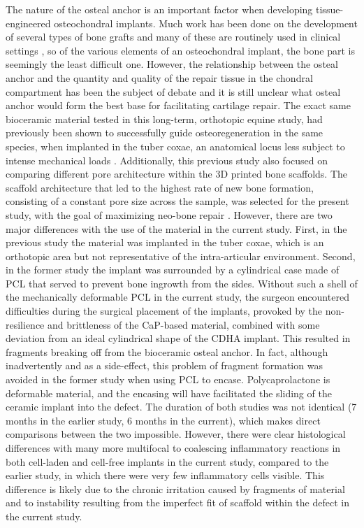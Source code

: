 \documentclass[twocolumn, empirical, authordate, issue]{jote-new-article}
\begin{document}
The nature of the osteal anchor is an important factor when developing tissue-engineered osteochondral implants. Much work has been done on the development of several types of bone grafts and many of these are routinely used in clinical settings \parencite{Oryan2014}, so of the various elements of an osteochondral implant, the bone part is seemingly the least difficult one. However, the relationship between the osteal anchor and the quantity and quality of the repair tissue in the chondral compartment has been the subject of debate \parencite{Bal2010} and it is still unclear what osteal anchor would form the best base for facilitating cartilage repair. The exact same bioceramic material tested in this long-term, orthotopic equine study, had previously been shown to successfully guide osteoregeneration in the same species, when implanted in the tuber coxae, an anatomical locus less subject to intense mechanical loads \parencite{Diloksumpan2020}. Additionally, this previous study also focused on comparing different pore architecture within the 3D printed bone scaffolds. The scaffold architecture that led to the highest rate of new bone formation, consisting of a constant pore size across the sample, was selected for the present study, with the goal of maximizing neo-bone repair \parencite{Diloksumpan2020}. However, there are two major differences with the use of the material in the current study. First, in the previous study the material was implanted in the tuber coxae, which is an orthotopic area but not representative of the intra-articular environment. Second, in the former study the implant was surrounded by a cylindrical case made of PCL that served to prevent bone ingrowth from the sides. Without such a shell of the mechanically deformable PCL in the current study, the surgeon encountered difficulties during the surgical placement of the implants, provoked by the non-resilience and brittleness of the CaP-based material, combined with some deviation from an ideal cylindrical shape of the CDHA implant. This resulted in fragments breaking off from the bioceramic osteal anchor. In fact, although inadvertently and as a side-effect, this problem of fragment formation was avoided in the former study when using PCL to encase. Polycaprolactone is deformable material, and the encasing will have facilitated the sliding of the ceramic implant into the defect. The duration of both studies was not identical (7 months in the earlier study, 6 months in the current), which makes direct comparisons between the two impossible. However, there were clear histological differences with many more multifocal to coalescing inflammatory reactions in both cell-laden and cell-free implants in the current study, compared to the earlier study, in which there were very few inflammatory cells visible. This difference is likely due to the chronic irritation caused by fragments of material and to instability resulting from the imperfect fit of scaffold within the defect in the current study.
\end{document}

